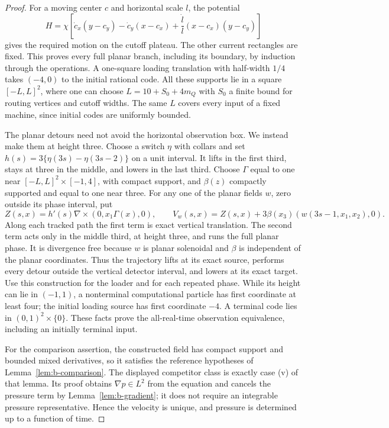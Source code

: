 \begin{proof}
For a moving center $c$ and horizontal scale $l$, the potential
\[
 H=\chi\left[\dot c_x(y-c_y)-\dot c_y(x-c_x)
                    +\frac{\dot l}{l}(x-c_x)(y-c_y)\right]
\]
gives the required motion on the cutoff plateau. The other current
rectangles are fixed. This proves every full planar branch, including
its boundary, by induction through the operations. A one-square loading
translation with half-width $1/4$ takes $(-4,0)$ to the initial rational
code. All these supports lie in a square $[-L,L]^2$, where one can choose
$L=10+S_0+4m_Q$ with $S_0$ a finite bound for routing vertices and cutoff
widths. The same $L$ covers every input of a fixed machine, since initial
codes are uniformly bounded.

The planar detours need not avoid the horizontal observation box.
We instead make them at height three. Choose a switch $\eta$ with
collars and set
$h(s)=3\{\eta(3s)-\eta(3s-2)\}$ on a unit interval. It lifts in the
first third, stays at three in the middle, and lowers in the last third.
Choose $\Gamma$ equal to one near $[-L,L]^2\times[-1,4]$, with compact
support, and $\beta(z)$ compactly supported and equal to one near three.
For any one of the planar fields $w$, zero outside its phase interval,
put
\[
 Z(s,x)=h'(s)\nabla\times(0,x_1\Gamma(x),0),\qquad
 V_w(s,x)=Z(s,x)+3\beta(x_3)(w(3s-1,x_1,x_2),0).
\]
Along each tracked path the first term is exact vertical translation.
The second term acts only in the middle third, at height three, and runs
the full planar phase. It is divergence free because $w$ is planar
solenoidal and $\beta$ is independent of the planar coordinates.
Thus the trajectory lifts at its exact source, performs every detour
outside the vertical detector interval, and lowers at its exact target.
Use this construction for the loader and for each repeated phase. While
its height can lie in $(-1,1)$, a nonterminal computational particle has
first coordinate at least four; the initial loading source has first
coordinate $-4$. A terminal code lies in $(0,1)^2\times\{0\}$.
These facts prove the all-real-time observation equivalence, including
an initially terminal input.

For the comparison assertion, the constructed field has compact support
and bounded mixed derivatives, so it satisfies the reference hypotheses
of Lemma~\ref{lem:b-comparison}. The displayed competitor class is exactly
case (v) of that lemma. Its proof obtains $\nabla p\in L^2$ from the
equation and cancels the pressure term by Lemma~\ref{lem:b-gradient}; it
does not require an integrable pressure representative. Hence the velocity
is unique, and pressure is determined up to a function of time.


\end{proof}
